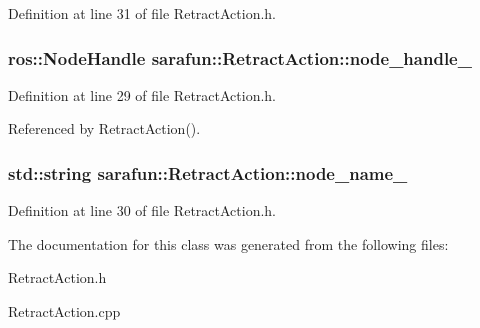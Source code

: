 Definition at line 31 of file Retract\-Action.\-h.

\hypertarget{classsarafun_1_1RetractAction_aaed00694d79d51ddd40fa3d098faaccd_aaed00694d79d51ddd40fa3d098faaccd}{
\subsubsection[{node\-\_\-handle\-\_\-}]{\setlength{\rightskip}{0pt plus 5cm}ros\-::\-Node\-Handle sarafun\-::\-Retract\-Action\-::node\-\_\-handle\-\_\-\hspace{0.3cm}{\ttfamily [private]}}}\label{classsarafun_1_1RetractAction_aaed00694d79d51ddd40fa3d098faaccd_aaed00694d79d51ddd40fa3d098faaccd}


Definition at line 29 of file Retract\-Action.\-h.



Referenced by Retract\-Action().

\hypertarget{classsarafun_1_1RetractAction_ab4386c388115f5b76ff82f55895cc1ee_ab4386c388115f5b76ff82f55895cc1ee}{
\subsubsection[{node\-\_\-name\-\_\-}]{\setlength{\rightskip}{0pt plus 5cm}std\-::string sarafun\-::\-Retract\-Action\-::node\-\_\-name\-\_\-\hspace{0.3cm}{\ttfamily [private]}}}\label{classsarafun_1_1RetractAction_ab4386c388115f5b76ff82f55895cc1ee_ab4386c388115f5b76ff82f55895cc1ee}


Definition at line 30 of file Retract\-Action.\-h.



The documentation for this class was generated from the following files\-:\begin{DoxyCompactItemize}
\item 
Retract\-Action.\-h\item 
Retract\-Action.\-cpp\end{DoxyCompactItemize}
